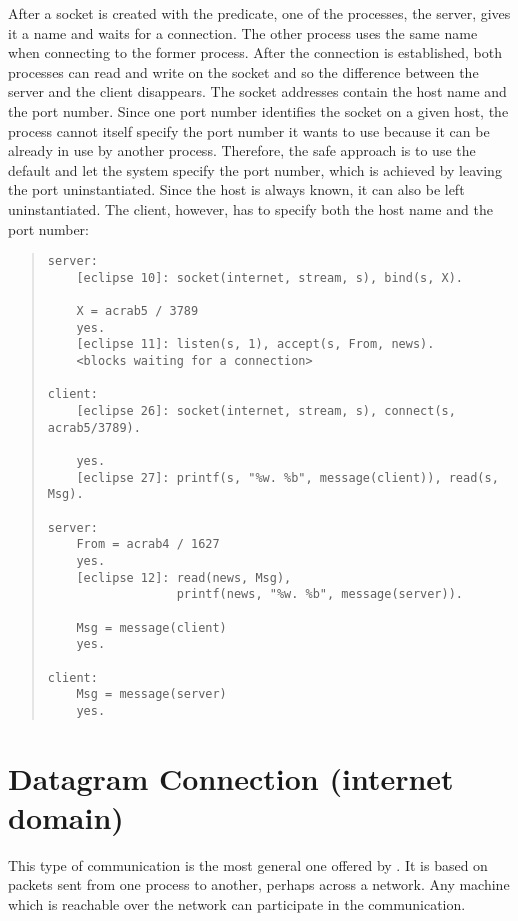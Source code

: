 After a socket is created with the
 predicate,
one of the processes, the server, gives it a name
and waits for a connection.
The other process uses the same name when connecting to
the former process.
After the connection is established, both processes can read and write
on the socket and so the difference between the server and the
client disappears.
The socket addresses contain the host name and the port number.
Since one port number identifies the socket on a given host,
the process cannot itself specify the port number it wants to use
because it can be already in use by another process.
Therefore, the safe approach is to use the default and let the system
specify the port number, which is achieved by leaving the port
uninstantiated.
Since the host is always known,
it can also be left uninstantiated.
The client, however, has to specify both the host name and the port number:
\begin{quote}
\begin{verbatim}
server:
    [eclipse 10]: socket(internet, stream, s), bind(s, X).

    X = acrab5 / 3789
    yes.
    [eclipse 11]: listen(s, 1), accept(s, From, news).
    <blocks waiting for a connection>

client:
    [eclipse 26]: socket(internet, stream, s), connect(s, acrab5/3789).

    yes.
    [eclipse 27]: printf(s, "%w. %b", message(client)), read(s, Msg).

server:
    From = acrab4 / 1627
    yes.
    [eclipse 12]: read(news, Msg),
                  printf(news, "%w. %b", message(server)).

    Msg = message(client)
    yes.

client:
    Msg = message(server)
    yes.
\end{verbatim}
\end{quote}

\section{Datagram Connection (internet domain)}
This type of communication is the most general one offered by {\eclipse}.
It is based on packets sent from one process to another, perhaps across
a network. Any machine which is reachable over
the network can participate in the communication.

